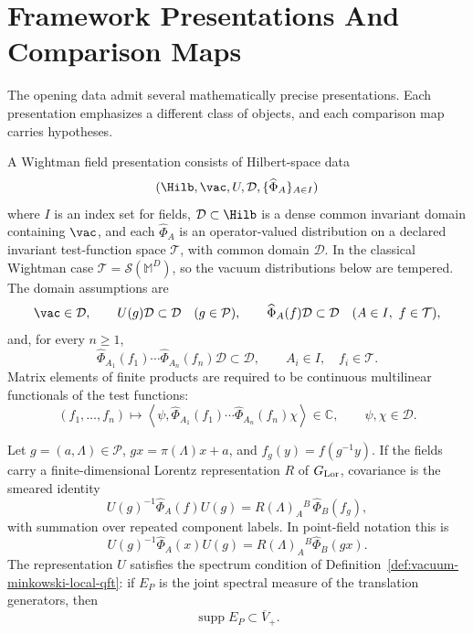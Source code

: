 \section{Framework Presentations And Comparison Maps}

The opening data admit several mathematically precise presentations.  Each
presentation emphasizes a different class of objects, and each comparison map
carries hypotheses.

\begin{definition}
\label{def:wightman-field-presentation-opening}
  A Wightman field presentation consists of Hilbert-space data
  \[
    (\Hilb,\vac,U,\mathcal D,\{\widehat\Phi_A\}_{A\in I})
  \]
  where \(I\) is an index set for fields, \(\mathcal D\subset\Hilb\) is a
  dense common invariant domain containing \(\vac\), and each \(\widehat\Phi_A\) is an
  operator-valued distribution on a declared invariant test-function space
  \(\mathcal T\), with common domain \(\mathcal D\).  In the classical
  Wightman case \(\mathcal T=\mathcal S(\mathbb M^D)\), so the vacuum
  distributions below are tempered.  The domain assumptions are
  \[
    \vac\in\mathcal D,\qquad
    U(g)\mathcal D\subset\mathcal D\quad(g\in\mathcal P),\qquad
    \widehat\Phi_A(f)\mathcal D\subset\mathcal D\quad(A\in I,\ f\in\mathcal T),
  \]
  and, for every \(n\ge1\),
  \[
    \widehat\Phi_{A_1}(f_1)\cdots\widehat\Phi_{A_n}(f_n)\mathcal D
    \subset
    \mathcal D,
    \qquad A_i\in I,\quad f_i\in\mathcal T.
  \]
  Matrix elements of finite products are required to be continuous multilinear
  functionals of the test functions:
  \[
    (f_1,\ldots,f_n)
    \longmapsto
    \left\langle\psi,
    \widehat\Phi_{A_1}(f_1)\cdots\widehat\Phi_{A_n}(f_n)\chi
    \right\rangle
    \in\mathbb C,
    \qquad \psi,\chi\in\mathcal D .
  \]

  Let \(g=(a,\Lambda)\in\mathcal P\), \(gx=\pi(\Lambda)x+a\), and
  \(f_g(y)=f(g^{-1}y)\).  If the fields carry a finite-dimensional Lorentz
  representation \(R\) of \(G_{\rm Lor}\), covariance is the smeared identity
  \[
    U(g)^{-1}\widehat\Phi_A(f)U(g)
    =
    R(\Lambda)_A{}^B\,\widehat\Phi_B(f_g),
  \]
  with summation over repeated component labels.  In point-field notation this
  is
  \[
    U(g)^{-1}\widehat\Phi_A(x)U(g)=R(\Lambda)_A{}^B\widehat\Phi_B(gx).
  \]
  The representation \(U\) satisfies the spectrum condition of
  Definition~\ref{def:vacuum-minkowski-local-qft}: if \(E_P\) is the joint
  spectral measure of the translation generators, then
  \[
    \operatorname{supp}E_P\subset\overline V_+.
  \]


\end{definition}
